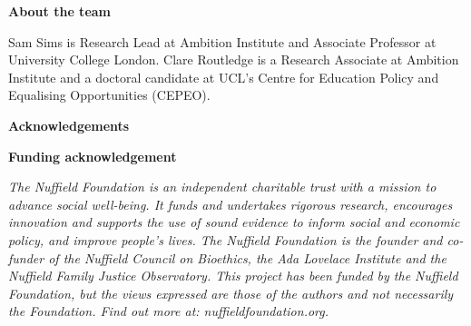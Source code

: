 \thispagestyle{empty}
\maketitle

\vspace{2cm}
\noindent\textbf{About the team}

Sam Sims is Research Lead at Ambition Institute and Associate Professor at University College London.
Clare Routledge is a Research Associate at Ambition Institute and a doctoral candidate at UCL's Centre
for Education Policy and Equalising Opportunities (CEPEO).

\vspace{1cm}
\noindent\textbf{Acknowledgements}


\vspace{1cm}
\noindent\textbf{Funding acknowledgement}

\noindent\textit{The Nuffield Foundation is an independent charitable trust with a mission to
advance social well-being. It funds and undertakes rigorous research, encourages innovation and
supports the use of sound evidence to inform social and economic policy, and improve people's lives.
The Nuffield Foundation is the founder and co-funder of the Nuffield Council on Bioethics, the Ada
Lovelace Institute and the Nuffield Family Justice Observatory. This project has been funded by the
Nuffield Foundation, but the views expressed are those of the authors and not necessarily the
Foundation. Find out more at: nuffieldfoundation.org.}


\clearpage
